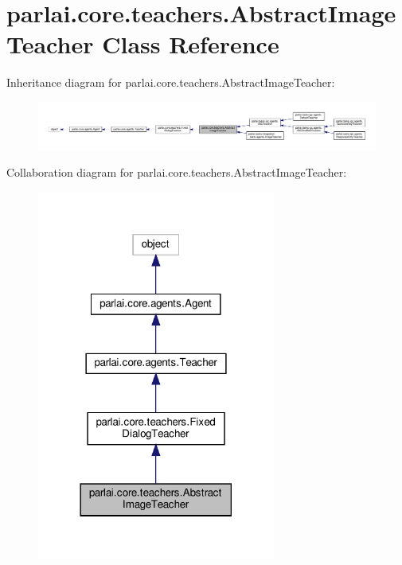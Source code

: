 \hypertarget{classparlai_1_1core_1_1teachers_1_1AbstractImageTeacher}{}\section{parlai.\+core.\+teachers.\+Abstract\+Image\+Teacher Class Reference}
\label{classparlai_1_1core_1_1teachers_1_1AbstractImageTeacher}


Inheritance diagram for parlai.\+core.\+teachers.\+Abstract\+Image\+Teacher\+:
\nopagebreak
\begin{figure}[H]
\begin{center}
\leavevmode
\includegraphics[width=350pt]{da/dee/classparlai_1_1core_1_1teachers_1_1AbstractImageTeacher__inherit__graph}
\end{center}
\end{figure}


Collaboration diagram for parlai.\+core.\+teachers.\+Abstract\+Image\+Teacher\+:
\nopagebreak
\begin{figure}[H]
\begin{center}
\leavevmode
\includegraphics[width=222pt]{dc/d47/classparlai_1_1core_1_1teachers_1_1AbstractImageTeacher__coll__graph}
\end{center}
\end{figure}
